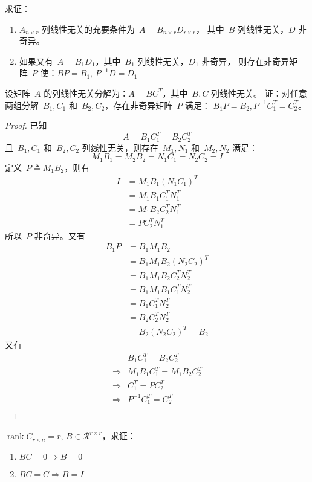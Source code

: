 \documentclass[twoside,openright]{book}
\begin{document}
\begin{CJK*}{UTF8}{}
\begin{quest}
\label{quest:152}
求证：
\begin{enumerate}
\item
$A_{n\times r}$ 列线性无关的充要条件为\ $A=B_{n\times r}D_{r\times r}$，
其中\ $B$ 列线性无关，$D$ 非奇异。
\item
如果又有\ $A=B_1D_1$，其中\ $B_1$ 列线性无关，$D_1$ 非奇异，
则存在非奇异矩阵\ $P$ 使：$B P = B_1$, $P^{-1} D = D_1$
\end{enumerate}
\end{quest}

\begin{quest}
\label{quest:153}
设矩阵\ $A$ 的列线性无关分解为：$A = B C^T$，其中\ $B, C$ 列线性无关。
证：对任意两组分解\ $B_1, C_1$ 和\ $B_2, C_2$，存在非奇异矩阵\ $P$ 满足：
$B_1 P = B_2, P^{-1} C_1^T = C_2^T$。
\end{quest}
\begin{proof}
已知
\[
A = B_1 C_1^T = B_2 C_2^T
\]
且\ $B_1, C_1$ 和\ $B_2, C_2$ 列线性无关，则存在\ $M_1, N_1$ 和\ $M_2, N_2$ 满足：
\[
M_1 B_1 = M_2 B_2 = N_1 C_1 = N_2 C_2 = I
\]
定义\ $P \triangleq M_1 B_2$，则有
\[
\begin{split}
I
&= M_1 B_1 (N_1 C_1)^T \\
&= M_1 B_1 C_1^T N_1^T \\
&= M_1 B_2 C_2^T N_1^T \\
&= P C_2^T N_1^T
\end{split}
\]
所以\ $P$ 非奇异。又有
\[
\begin{split}
B_1 P
&= B_1 M_1 B_2 \\
&= B_1 M_1 B_2 (N_2 C_2)^T \\
&= B_1 M_1 B_2 C_2^T N_2^T \\
&= B_1 M_1 B_1 C_1^T N_2^T \\
&= B_1 C_1^T N_2^T \\
&= B_2 C_2^T N_2^T \\
&= B_2 (N_2 C_2)^T = B_2
\end{split}
\]
又有
\[
\begin{split}
& B_1 C_1^T = B_2 C_2^T \\
\Longrightarrow & M_1 B_1 C_1^T = M_1 B_2 C_2^T \\
\Longrightarrow & C_1^T = P C_2^T \\
\Longrightarrow & P^{-1} C_1^T = C_2^T \\
\end{split}
\]
\end{proof}

\begin{quest}
\label{quest:154}
$\operatorname{rank}C_{r\times n}=r$,
$B \in \mathcal{R}^{r\times r}$，求证：
\begin{enumerate}
\item
$BC=0\Longrightarrow B=0$
\item
$BC=C\Longrightarrow B=I$
\end{enumerate}
\end{quest}


\end{CJK*}
\end{document}
